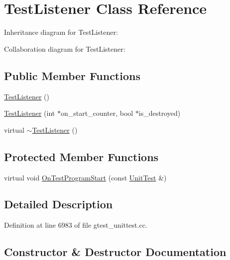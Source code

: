 \hypertarget{class_test_listener}{}\section{Test\+Listener Class Reference}
\label{class_test_listener}


Inheritance diagram for Test\+Listener\+:


Collaboration diagram for Test\+Listener\+:
\subsection*{Public Member Functions}
\begin{DoxyCompactItemize}
\item 
\hyperlink{class_test_listener_ae20c874ce92777371de6d024df229e9f}{Test\+Listener} ()
\item 
\hyperlink{class_test_listener_ab65604c6c3742c494e9378e770da5d42}{Test\+Listener} (int $\ast$on\+\_\+start\+\_\+counter, bool $\ast$is\+\_\+destroyed)
\item 
virtual \hyperlink{class_test_listener_ae59dec3ae673618185eebf71881902e9}{$\sim$\+Test\+Listener} ()
\end{DoxyCompactItemize}
\subsection*{Protected Member Functions}
\begin{DoxyCompactItemize}
\item 
virtual void \hyperlink{class_test_listener_a6218f522f5b6b37050ff0ea630ac5fd3}{On\+Test\+Program\+Start} (const \hyperlink{classtesting_1_1_unit_test}{Unit\+Test} \&)
\end{DoxyCompactItemize}


\subsection{Detailed Description}


Definition at line 6983 of file gtest\+\_\+unittest.\+cc.



\subsection{Constructor \& Destructor Documentation}
